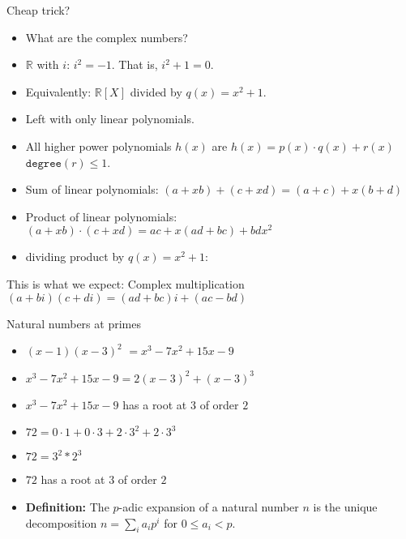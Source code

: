 \documentclass[8pt]{beamer}
\newcommand{\degree}{\texttt{degree}}
\begin{document}
\begin{frame}[fragile]{Cheap trick?}

\begin{itemize}
\item What are the complex numbers? \pause
\item $\mathbb R$ with $i$: $i^2 = -1$. \pause That is, $i^2 + 1 = 0$. \pause
\item Equivalently: $\mathbb R[X]$ \pause divided by $q(x) = x^2 + 1$. \pause
\item Left with only linear polynomials. \pause
\item All higher power polynomials $h(x)$  are $h(x) = p(x) \cdot q(x) + r(x)$ \pause $\degree(r) \leq 1$.
\item Sum of linear polynomials: $(a + xb) + (c + xd) = (a + c) + x(b + d) $\pause
\item Product of linear polynomials: $(a + xb) \cdot (c + xd) = ac + x(ad + bc) + bdx^2$ \pause
\item dividing product by $q(x) = x^2 + 1$:
\end{itemize}


\begin{block}{This is what we expect: Complex multiplication}
$(a + bi) (c + di) = (ad + bc) i + (ac - bd)$
\end{block}
\end{frame}

\begin{frame}{Natural numbers at primes}

\begin{itemize}
\item $(x - 1)(x - 3)^2$ \pause $ = x^3 - 7x^2 + 15x - 9$ \pause
\item $x^3 - 7x^2 + 15x - 9 =  2(x - 3)^2 + (x - 3)^3$ \pause
\item $x^3 - 7x^2 + 15x - 9$ has a root at $3$ of order $2$ \pause
\item $72 = 0\cdot 1 + 0 \cdot 3 + 2 \cdot 3^2 + 2 \cdot 3^3$ \pause
\item $72 = 3^2 * 2^3$ \pause
\item $72$ has a root at $3$ of order $2$ \pause
\item \textbf{Definition:} The $p$-adic expansion of a natural number $n$ is
   the unique decomposition $n = \sum_i a_i p^i$ for $0 \leq a_i < p$.
\end{itemize}
\end{frame}
\end{document}
